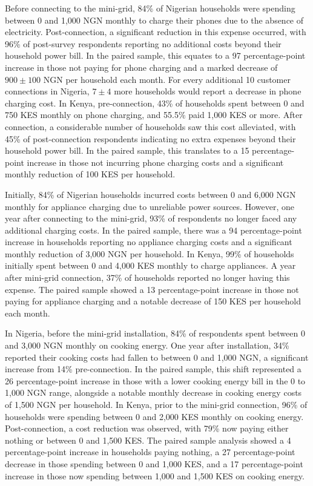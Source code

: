Before connecting to the mini-grid, 84\% of Nigerian households were spending between 0 and 1,000 NGN monthly to charge their phones due to the absence of electricity. Post-connection, a significant reduction in this expense occurred, with 96\% of post-survey respondents reporting no additional costs beyond their household power bill. In the paired sample, this equates to a 97 percentage-point increase in those not paying for phone charging and a marked decrease of $900\pm100$ NGN per household each month. For every additional 10 customer connections in Nigeria, $7\pm4$ more households would report a decrease in phone charging cost. In Kenya, pre-connection, 43\% of households spent between 0 and 750 KES monthly on phone charging, and 55.5\% paid 1,000 KES or more. After connection, a considerable number of households saw this cost alleviated, with 45\% of post-connection respondents indicating no extra expenses beyond their household power bill. In the paired sample, this translates to a 15 percentage-point increase in those not incurring phone charging costs and a significant monthly reduction of 100 KES per household.

Initially, 84\% of Nigerian households incurred costs between 0 and 6,000 NGN monthly for appliance charging due to unreliable power sources. However, one year after connecting to the mini-grid, 93\% of respondents no longer faced any additional charging costs. In the paired sample, there was a 94 percentage-point increase in households reporting no appliance charging costs and a significant monthly reduction of 3,000 NGN per household. In Kenya, 99\% of households initially spent between 0 and 4,000 KES monthly to charge appliances. A year after mini-grid connection, 37\% of households reported no longer having this expense. The paired sample showed a 13 percentage-point increase in those not paying for appliance charging and a notable decrease of 150 KES per household each month.

In Nigeria, before the mini-grid installation, 84\% of respondents spent between 0 and 3,000 NGN monthly on cooking energy. One year after installation, 34\% reported their cooking costs had fallen to between 0 and 1,000 NGN, a significant increase from 14\% pre-connection. In the paired sample, this shift represented a 26 percentage-point increase in those with a lower cooking energy bill in the 0 to 1,000 NGN range, alongside a notable monthly decrease in cooking energy costs of 1,500 NGN per household. In Kenya, prior to the mini-grid connection, 96\% of households were spending between 0 and 2,000 KES monthly on cooking energy. Post-connection, a cost reduction was observed, with 79\% now paying either nothing or between 0 and 1,500 KES. The paired sample analysis showed a 4 percentage-point increase in households paying nothing, a 27 percentage-point decrease in those spending between 0 and 1,000 KES, and a 17 percentage-point increase in those now spending between 1,000 and 1,500 KES on cooking energy.

